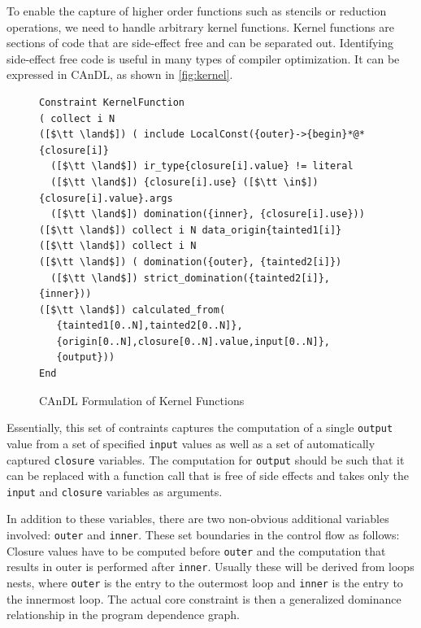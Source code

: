     To enable the capture of higher order functions such as stencils or
    reduction operations, we need to handle arbitrary kernel functions.
    Kernel functions are sections of code that are side-effect free and
    can be separated out. Identifying side-effect free code is useful in
    many types of compiler optimization.  It can be expressed in CAnDL, as
    shown in \autoref{fig:kernel}.

\begin{figure}[ht]
\begin{lstlisting}[language=CAnDL]
Constraint KernelFunction
( collect i N
([$\tt \land$]) ( include LocalConst({outer}->{begin}*@*{closure[i]}
  ([$\tt \land$]) ir_type{closure[i].value} != literal
  ([$\tt \land$]) {closure[i].use} ([$\tt \in$]) {closure[i].value}.args
  ([$\tt \land$]) domination({inner}, {closure[i].use}))
([$\tt \land$]) collect i N data_origin{tainted1[i]}
([$\tt \land$]) collect i N
([$\tt \land$]) ( domination({outer}, {tainted2[i]})
  ([$\tt \land$]) strict_domination({tainted2[i]}, {inner}))
([$\tt \land$]) calculated_from(
   {tainted1[0..N],tainted2[0..N]},
   {origin[0..N],closure[0..N].value,input[0..N]},
   {output}))
End
\end{lstlisting}
\vspace{-0.3cm}
\caption{CAnDL Formulation of Kernel Functions}
\label{fig:kernel}
\end{figure}

    Essentially, this set of contraints captures the computation of a
    single \texttt{output} value from a set of specified \texttt{input}
    values as well as a set of automatically captured \texttt{closure}
    variables.  The computation for \texttt{output} should be such that it
    can be replaced with a function call that is free of side effects and
    takes only the \texttt{input} and \texttt{closure} variables as
    arguments.

    In addition to these variables, there are two non-obvious additional
    variables involved: \texttt{outer} and \texttt{inner}.
    These set boundaries in the control flow as follows: Closure values have to
    be computed before \texttt{outer} and the computation that results in outer
    is performed after \texttt{inner}.
    Usually these will be derived from loops nests, where \texttt{outer} is the
    entry to the outermost loop and \texttt{inner} is the entry to the innermost
    loop.
    The actual core constraint is then a generalized dominance relationship in
    the program dependence graph.

